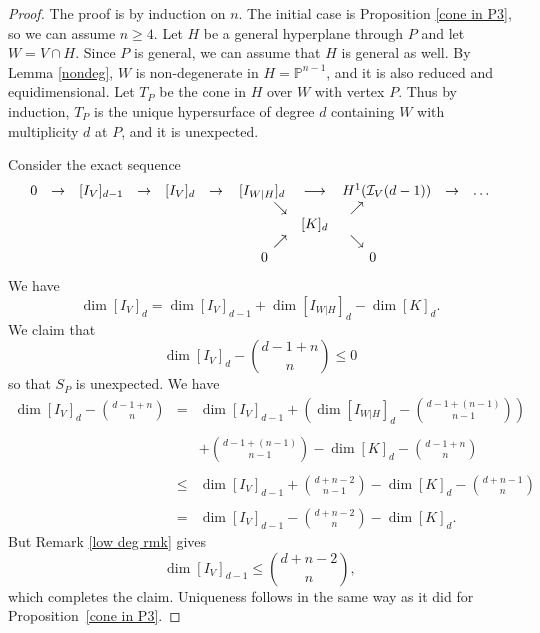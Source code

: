 \documentclass[12pt]{amsart}
\numberwithin{equation}{section}
\theoremstyle{definition}
\newcommand{\PP}{ \ensuremath{\mathbb{P}}}
\begin{document}
\begin{proof}
The proof is by induction on $n$. The initial case is Proposition \ref{cone in P3}, so we can assume $n \geq 4$.
Let $H$ be a general hyperplane through $P$ and let $W = V \cap H$. Since $P$ is general, we can assume that $H$ is general as well.
By Lemma \ref{nondeg}, $W$ is non-degenerate in $H = \PP^{n-1}$, and it is also reduced and equidimensional. Let $T_P$ be the cone in 
$H$ over $W$ with vertex $P$. Thus by induction, $T_P$ is the unique hypersurface of degree $d$ containing $W$ with multiplicity $d$ at $P$, and it is unexpected.

Consider the exact sequence
\[
\begin{array}{ccccccccccccccccccc}
0 & \rightarrow & [I_V]_{d-1} & \rightarrow & [I_V]_d & \rightarrow & [I_{W|H} ]_d & \longrightarrow & H^1(\mathcal I_V(d-1)) & \rightarrow & \dots \\
&&&&&&\hbox{\ \ \ \ \ \ \ } \searrow & & \nearrow \hbox{\ \ \ \ \ \ \ \ \ \ \ \ } \\
&&&&&&& [K]_d \\
&&&&&&\hbox{\ \ \ \ \ \ \ } \nearrow & & \searrow \hbox{\ \ \ \ \ \ \ \ \ \ \ \ } \\
&&&&&&\hbox{\  } 0 & & 0 \hbox{\ \ \ \ \ \  } \\
\end{array}
\]
We have
\[
\dim [I_V]_d = \dim [I_V]_{d-1} + \dim [I_{W|H}]_d - \dim [K]_d.
\]
We claim that  
\[
\dim [I_V]_d - \binom{d-1+n}{n} \leq 0
\]
so that $S_P$ is unexpected. We have
\[
\begin{array}{rcl}
\displaystyle \dim [I_V]_d - \binom{d-1+n}{n} & = & \displaystyle \dim [I_V]_{d-1}  + \left ( \dim [I_{W|H}]_d - \binom{d-1+(n-1)}{n-1} \right ) \\ \\
&& \displaystyle + \binom{d-1+(n-1)}{n-1} - \dim [K]_d - \binom{d-1+n}{n} \\ \\
& \leq & \displaystyle  \dim [I_V]_{d-1} + \binom{d+n-2}{n-1} - \dim [K]_d - \binom{d+n-1}{n} \\ \\
& = & \displaystyle \dim [I_V]_{d-1} - \binom{d+n-2}{n} - \dim [K]_d  .
\end{array}
\]
But Remark \ref{low deg rmk} gives
\[
\dim [I_V]_{d-1} \leq \binom{d+n-2}{n},
\]
which completes the claim.  Uniqueness follows in the same way as it did for Proposition~\ref{cone in P3}.
\end{proof}
\end{document}
